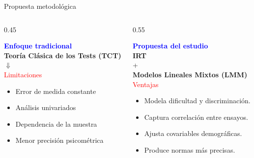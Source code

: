 \documentclass[aspectratio=169]{beamer}
\begin{document}
\begin{frame}{Propuesta metodológica}
	\vspace{-1cm}
	\begin{columns}[T]
		
		\begin{column}{0.45\textwidth}
			
	
				\begin{center}
						\textcolor{blue}{\bf Enfoque tradicional}\\
					\textbf{Teoría Clásica de los Tests (TCT)}\\
					\vspace{0.2cm}
					\Large $\Downarrow$\\
					\vspace{0.2cm}
					\textcolor{red}{\small Limitaciones}
				\end{center}
				
				\begin{itemize}
					\item Error de medida constante
					\item Análisis univariados
					\item Dependencia de la muestra
					\item Menor precisión psicométrica
				\end{itemize}
			
		\end{column}
		
		\begin{column}{0.55\textwidth}
		
	
			\begin{center}
					\textcolor{blue}{\bf Propuesta del estudio}\\
				\textbf{IRT}\\
				\vspace{0.1cm}
				\Large +\\
				\vspace{0.1cm}
				\textbf{\small Modelos Lineales Mixtos (LMM)}\\
				\textcolor{red}{\small Ventajas}
			\end{center}
			
			
			
			\begin{itemize}
					\item Modela dificultad y discriminación.
					\item Captura correlación entre ensayos.
					\item Ajusta covariables demográficas.
					\item Produce normas más precisas.
			\end{itemize}
			
		\end{column}
		
	\end{columns}
	
\end{frame}
\end{document}
